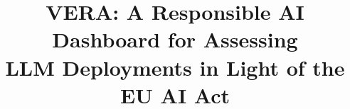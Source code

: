 \documentclass[10pt,conference,a4paper]{IEEEtran}
\begin{document}
\title{VERA: A Responsible AI Dashboard for Assessing\\ LLM Deployments in Light of the EU AI Act}

\author{%
}

\maketitle
\end{document}
